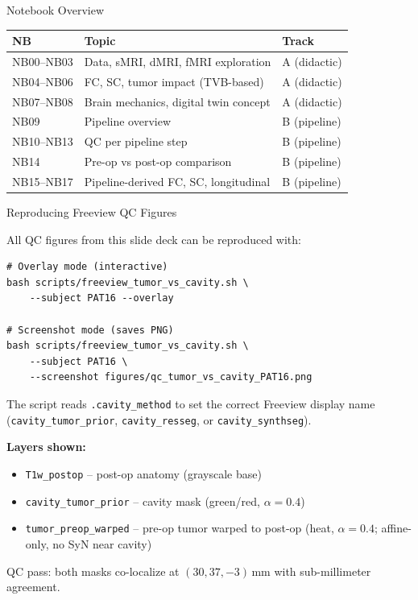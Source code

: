 \begin{frame}{Notebook Overview}

  \small

  \begin{tabular}{lll}
    \toprule
    \textbf{NB} & \textbf{Topic} & \textbf{Track} \\
    \midrule
    NB00--NB03 & Data, sMRI, dMRI, fMRI exploration & A (didactic) \\
    NB04--NB06 & FC, SC, tumor impact (TVB-based) & A (didactic) \\
    NB07--NB08 & Brain mechanics, digital twin concept & A (didactic) \\
    \midrule
    NB09 & Pipeline overview & B (pipeline) \\
    NB10--NB13 & QC per pipeline step & B (pipeline) \\
    NB14 & Pre-op vs post-op comparison & B (pipeline) \\
    NB15--NB17 & Pipeline-derived FC, SC, longitudinal & B (pipeline) \\
    \bottomrule
  \end{tabular}

\end{frame}

\begin{frame}[fragile]{Reproducing Freeview QC Figures}

  \small

  All QC figures from this slide deck can be reproduced with:

  \begin{lstlisting}
# Overlay mode (interactive)
bash scripts/freeview_tumor_vs_cavity.sh \
    --subject PAT16 --overlay

# Screenshot mode (saves PNG)
bash scripts/freeview_tumor_vs_cavity.sh \
    --subject PAT16 \
    --screenshot figures/qc_tumor_vs_cavity_PAT16.png
  \end{lstlisting}

  The script reads \texttt{.cavity\_method} to set the correct
  Freeview display name (\texttt{cavity\_tumor\_prior},
  \texttt{cavity\_resseg}, or \texttt{cavity\_synthseg}).

  \medskip

  \textbf{Layers shown:}
  \begin{itemize}
    \item \texttt{T1w\_postop} -- post-op anatomy (grayscale base)
    \item \texttt{cavity\_tumor\_prior} -- cavity mask (green/red,
      $\alpha = 0.4$)
    \item \texttt{tumor\_preop\_warped} -- pre-op tumor warped to
      post-op (heat, $\alpha = 0.4$; affine-only, no SyN near cavity)
  \end{itemize}

  QC pass: both masks co-localize at $(30, 37, {-}3)$\,mm
  with sub-millimeter agreement.

\end{frame}

